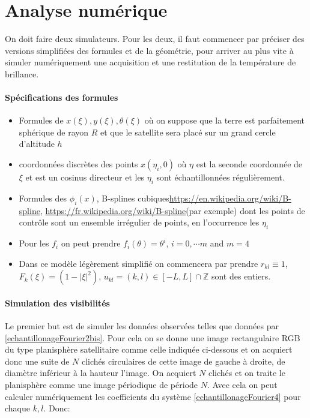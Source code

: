\documentclass{article}
\begin{document}
  \section{Analyse numérique}
  On  doit  faire deux simulateurs. Pour les deux, il faut commencer par  préciser  des versions simplifiées des  formules et  de la géométrie,  pour  arriver au plus vite à simuler numériquement une acquisition et une restitution de la température de brillance.
  \paragraph{Spécifications des formules}
  \begin{itemize}
      \item Formules de $x(\xi), y(\xi), \theta(\xi)$ où on suppose que la terre est parfaitement sphérique de rayon $R$ et que le satellite sera placé sur un grand cercle d'altitude $h$
      \item  coordonnées discrètes des  points $x(\eta_i, 0)$ où $\eta$ est la seconde coordonnée de $\xi$ et est  un cosinus directeur et les $\eta_i$ sont échantillonnées régulièrement. 
       \item Formules des $\phi_i(x)$, B-splines cubiques\newline \url{https://en.wikipedia.org/wiki/B-spline}, \url{https://fr.wikipedia.org/wiki/B-spline}\newline (par exemple) dont les  points de contrôle sont un ensemble irrégulier de points,  en l'occurrence les $\eta_i$
       \item Pour  les $f_i$ on peut prendre $f_i(\theta)=\theta^i$, $i=0, \cdots m$ and $m=4$
       \item Dans ce modèle légèrement simplifié on commencera par prendre $r_{kl}\equiv 1$, $F_k(\xi)=(1-|\xi|^2)$, $u_{kl}=(k,l)\in [-L,  L]\cap\mathbb{Z}$ sont des entiers.
       \end{itemize}
       
       \paragraph{Simulation des visibilités} Le premier but est de simuler les  données observées telles que données par \eqref{echantillonageFourier2bis}. Pour cela  on se  donne une  image  rectangulaire RGB du type  planisphère satellitaire comme celle indiquée ci-dessous et  on acquiert donc une suite de $N$ clichés circulaires de cette image de gauche à droite, de diamètre inférieur à la hauteur  l'image. On acquiert  $N$ clichés et on traite  le planisphère comme une image  périodique de  période $N$.
        Avec cela on  peut calculer numériquement les coefficients du système \eqref{echantillonageFourier4} pour  chaque  $k,l$. Donc:  
        
\end{document}
